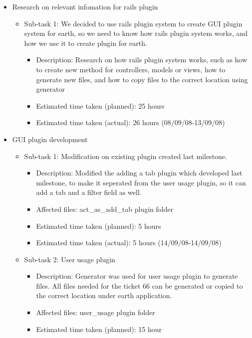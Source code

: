 \documentclass{article}
\begin{document}
\begin{itemize}
	\item Research on relevant infomation for rails plugin
	     \begin{itemize}
	        \item Sub-task 1: We decided to use rails plugin system to create GUI plugin system for earth, so we need to know how rails plugin system works, and how we use it to create plugin for earth.
	           \begin{itemize}
					\item Description: Research on how rails plugin system works, such as how to create new method for controllers, models or views, how to generate new files, and how to copy files to the correct location using generator
					\item Estimated time taken (planned): 25 hours
					\item Estimated time taken (actual):  26 hours (08/09/08-13/09/08)
				\end{itemize}
	     \end{itemize}
	\item GUI plugin development
	     \begin{itemize}
	         \item Sub-task 1: Modification on existing plugin created last milestone.
	            \begin{itemize}
	              \item Description: Modified the adding a tab plugin which developed last milestone, to make it seperated from the user usage plugin, so it can add a tab and a filter field as well.
					\item Affected files: act\_as\_add\_tab plugin folder
					\item Estimated time taken (planned): 5 hours
					\item Estimated time taken (actual): 5 hours (14/09/08-14/09/08)
				 \end{itemize}
	         \item Sub-task 2: User usage plugin
	            \begin{itemize}
				    \item Description: Generator was used for user usage plugin to generate files. All files needed for the ticket 66 can be generated or copied to the correct location under earth application.
					\item Affected files: user\_usage plugin folder
					\item Estimated time taken (planned): 15 hour

\end{itemize}
\end{itemize}
\end{itemize}
\end{document}
